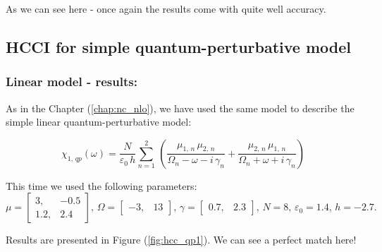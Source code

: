 \documentclass[12pt,twoside,a4paper]{article}
\numberwithin{equation}{subsection}
\numberwithin{figure}{subsection}
\begin{document}
As we can see here - once again the results come with quite well accuracy.

\subsection{HCCI for simple quantum-perturbative model} \label{chap:hcc_quantum}
 
\subsubsection*{Linear model - results:}

As in the Chapter (\ref{chap:nc_nlo}), we have used the same model to describe the simple linear quantum-perturbative model: 

\begin{equation} \label{eq:hcc_qp}
  {\chi_{1, \,qp}}(\omega ) = \frac {N}{\varepsilon_0\,h} \sum_{n=1}^{2}\,(\frac {{\mu_{1, \,n}}\,{ \mu_{2, \,n}}}{{\Omega_{n}}
  - \omega  - i\,{\gamma_{n}}} + \frac {{\mu_{2, \,n}}\,{\mu_{1, \,n}}}{{\Omega_{n}} + \omega + i\,{\gamma_{n}}})
\end{equation}

This time we used the following parameters: 
\begin{equation} \label{eq:hhc_qpconst2}
  \mu = \begin{bmatrix} 
     3, & -0.5 \\ 1.2, & 2.4 
  \end{bmatrix} , \, 
  \Omega = \begin{bmatrix} 
     -3, & 13 
  \end{bmatrix} , \,
  \gamma = \begin{bmatrix} 
     0.7, & 2.3
  \end{bmatrix} , \, 
  N = 8, \, 
  \varepsilon_0 = 1.4, \,
  h= - 2.7.
\end{equation}

Results are presented in Figure (\ref{fig:hcc_qp1}). We can see a perfect match here!
\end{document}
